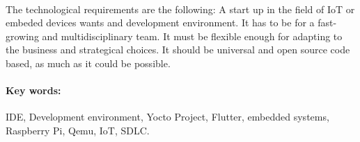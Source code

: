 \paragraph{} The technological requirements are the following: A start up in the field
of IoT or embeded devices wants and development environment. It has to be for a fast-growing
and multidisciplinary team. It must be flexible enough for adapting to the business
and strategical choices. It should be universal and open source code based, as much as
it could be possible.

\paragraph{Key words:} IDE, Development environment, Yocto Project, Flutter, embedded
systems, Raspberry Pi, Qemu, IoT, SDLC.

